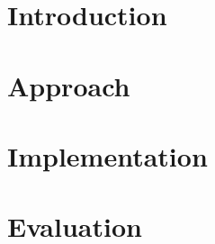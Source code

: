 \documentclass[11pt]{article}
\begin{document}
    \tableofcontents
    \newpage


    \section{Introduction}

    \section{Approach}

    \section{Implementation}

    \section{Evaluation}

    \printbibliography
    
\end{document}
